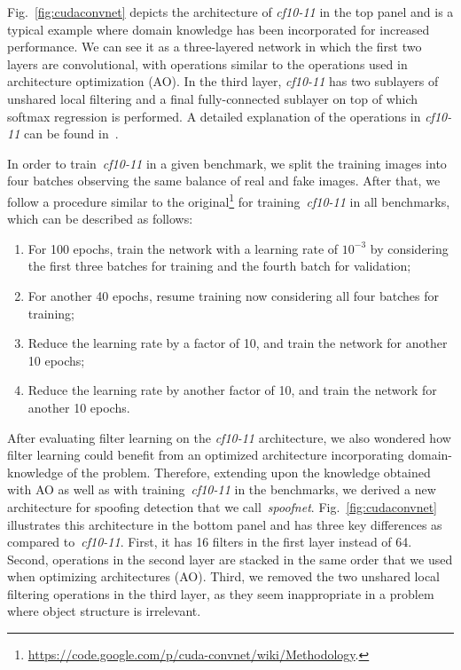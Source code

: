 Fig.~\ref{fig:cudaconvnet} depicts the architecture of \emph{cf10-11} in the top panel and is a typical example where domain knowledge has been incorporated for increased performance. We can see it as a three-layered network in which the first two layers are convolutional, with operations similar to the operations used in architecture optimization (AO). In the third layer, \emph{cf10-11} has two sublayers of unshared local filtering and a final fully-connected sublayer on top of which softmax regression is performed. A detailed explanation of the operations in \emph{cf10-11} can be found in~\cite{Krizhevsky:cuda-convnet:2012}.

In order to train~\emph{cf10-11} in a given benchmark, we split the training images into four batches observing the same balance of real and fake images. After that, we follow a procedure similar to the original\footnote{\url{https://code.google.com/p/cuda-convnet/wiki/Methodology}.} for training~\emph{cf10-11} in all benchmarks, which can be described as follows:

\begin{enumerate}
\item For 100 epochs, train the network with a learning rate of $10^{-3}$ by considering the first three batches for training and the fourth batch for validation;
\item For another 40 epochs, resume training now considering all four batches for training;
\item Reduce the learning rate by a factor of 10, and train the network for another 10 epochs;
\item Reduce the learning rate by another factor of 10, and train the network for another 10 epochs.
\\
\end{enumerate}


After evaluating filter learning on the \emph{cf10-11} architecture, we also wondered how filter learning could benefit from an optimized architecture incorporating domain-knowledge of the problem. Therefore, extending upon the knowledge obtained with AO as well as with training~\emph{cf10-11} in the benchmarks, we derived a new architecture for spoofing detection that we call~\emph{spoofnet}. Fig.~\ref{fig:cudaconvnet} illustrates this architecture in the bottom panel and has three key differences as compared to~\emph{cf10-11}. First, it has 16 filters in the first layer instead of 64. Second, operations in the second layer are stacked in the same order that we used when optimizing architectures (AO). Third, we removed the two unshared local filtering operations in the third layer, as they seem inappropriate in a problem where object structure is irrelevant.

